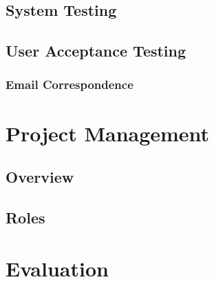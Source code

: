 \documentclass[12pt]{article}
\begin{document}
  \subsection{System Testing}
  \subsection{User Acceptance Testing}
    \subsubsection{Email Correspondence}
\section{Project Management}
  \subsection{Overview}
  \subsection{Roles}
\section{Evaluation}
\end{document}
